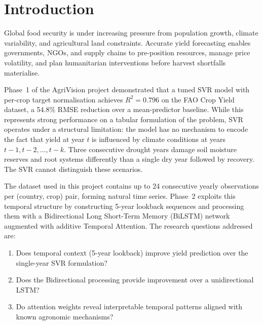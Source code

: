 \documentclass[conference]{IEEEtran}
\begin{document}
\section{Introduction}
\label{sec:intro}

Global food security is under increasing pressure from population growth,
climate variability, and agricultural land constraints.
Accurate yield forecasting enables governments, NGOs, and supply chains to
pre-position resources, manage price volatility, and plan humanitarian
interventions before harvest shortfalls materialise.

Phase~1 of the AgriVision project demonstrated that a tuned SVR model with
per-crop target normalisation achieves $R^{2} = 0.796$ on the FAO Crop Yield
dataset, a 54.8\% RMSE reduction over a mean-predictor baseline.
While this represents strong performance on a tabular formulation of the problem,
SVR operates under a structural limitation: the model has no mechanism to encode
the fact that yield at year $t$ is influenced by climate conditions at years
$t{-}1, t{-}2, \ldots, t{-}k$.
Three consecutive drought years damage soil moisture reserves and root systems
differently than a single dry year followed by recovery.
The SVR cannot distinguish these scenarios.

The dataset used in this project contains up to 24 consecutive yearly observations
per (country, crop) pair, forming natural time series.
Phase~2 exploits this temporal structure by constructing 5-year lookback sequences
and processing them with a Bidirectional Long Short-Term Memory (BiLSTM) network
augmented with additive Temporal Attention.
The research questions addressed are:
\begin{enumerate}
    \item Does temporal context (5-year lookback) improve yield prediction over
          the single-year SVR formulation?
    \item Does the Bidirectional processing provide improvement over a
          unidirectional LSTM?
    \item Do attention weights reveal interpretable temporal patterns aligned
          with known agronomic mechanisms?
\end{enumerate}
\end{document}
